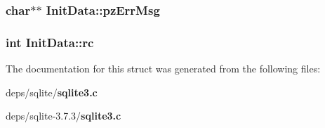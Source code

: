 \subsubsection{\setlength{\rightskip}{0pt plus 5cm}char$\ast$$\ast$ \bf{Init\-Data::pz\-Err\-Msg}}\label{structInitData_a8edf4b6f8fd4b3b8e2b3ae5a00dd25f}


\subsubsection{\setlength{\rightskip}{0pt plus 5cm}int \bf{Init\-Data::rc}}\label{structInitData_bd013447be64708465a2a5d07e311de8}




The documentation for this struct was generated from the following files:\begin{CompactItemize}
\item 
deps/sqlite/\bf{sqlite3.c}\item 
deps/sqlite-3.7.3/\bf{sqlite3.c}\end{CompactItemize}
